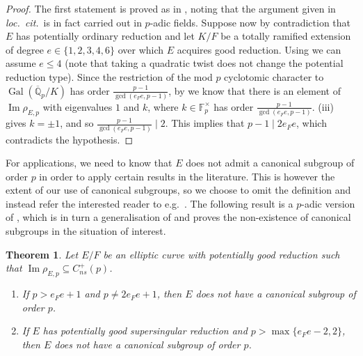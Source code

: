 \documentclass{amsart}
\newtheorem{theorem}{Theorem}
\theoremstyle{definition}
\newcommand{\F}{\mathbb{F}}
\newcommand{\NRep}[1]{\operatorname{Im}\rho_{E,#1}}
\newcommand{\BaseField}{F}
\newcommand{\GoodReductionExtension}{K}
\numberwithin{theorem}{section}
\numberwithin{equation}{section}
\begin{document}
\begin{proof}
    The first statement is proved as in \cite[Proposition 4.1]{furio24}, noting that the argument given in \textit{loc.~cit.}~is in fact carried out in $p$-adic fields.
    Suppose now by contradiction that $E$ has potentially ordinary reduction and let $\GoodReductionExtension/\BaseField$ be a totally ramified extension of degree $e \in \{1,2,3,4,6\}$ over which $E$ acquires good reduction. Using  we can assume $e \leq 4$ (note that taking a quadratic twist does not change the potential reduction type).
    Since the restriction of the mod $p$ cyclotomic character to $\operatorname{Gal}(\overline{\mathbb{Q}}_p/\GoodReductionExtension)$ has order $\frac{p-1}{\gcd(e_\BaseField e,p-1)}$, by \cite[Lemma 4.3]{furio24} we know that there is an element of $\NRep{p}$ with eigenvalues $1$ and $k$, where $k \in \F_p^\times$ has order $\frac{p-1}{\gcd(e_\BaseField e,p-1)}$. (iii) gives $k=\pm 1$, and so $\frac{p-1}{\gcd(e_\BaseField e,p-1)} \mid 2$. This implies that $p-1 \mid 2e_\BaseField e$, which contradicts the hypothesis.
\end{proof}

For applications, we need to know that $E$ does not admit a canonical subgroup of order $p$ in order to apply certain results in the literature. This is however the extent of our use of canonical subgroups, so we choose to omit the definition and instead refer the interested reader to e.g.~\cite[Definition 3.5]{furiolombardo23}. The following result is a $p$-adic version of \cite[Theorem 4.5]{furio24}, which is in turn a generalisation of \cite[Theorem 3.11]{furiolombardo23} and proves the non-existence of canonical subgroups in the situation of interest.

\begin{theorem}\label{thm: canonicalsbg}
Let $E/\BaseField$ be an elliptic curve with potentially good reduction such that $\operatorname{Im}\rho_{E,p} \subseteq C_{ns}^+(p)$.
	\begin{enumerate}
		\item If $p>e_\BaseField e+1$ and $p \ne 2e_\BaseField e+1$, then $E$ does not have a canonical subgroup of order $p$.
		\item If $E$ has potentially good supersingular reduction and $p > \max\{e_\BaseField e-2,2\}$, then $E$ does not have a canonical subgroup of order $p$.
	\end{enumerate}
\end{theorem}
	
\end{document}
